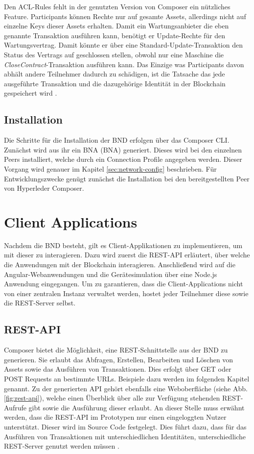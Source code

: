 Den ACL-Rules fehlt in der genutzten Version von Composer ein nützliches Feature. Participants können Rechte nur auf gesamte Assets, allerdings nicht auf einzelne Keys dieser Assets erhalten. Damit ein Wartungsanbieter die eben genannte Transaktion ausführen kann, benötigt er Update-Rechte für den Wartungsvertrag. Damit könnte er über eine Standard-Update-Transaktion den Status des Vertrags auf geschlossen stellen, obwohl nur eine Maschine die \textit{CloseContract}-Transaktion ausführen kann. Das Einzige was Participants davon abhält andere Teilnehmer dadurch zu schädigen, ist die Tatsache das jede ausgeführte Transaktion und die dazugehörige Identität in der Blockchain gespeichert wird \cite{SchererPerformanceScalabilityBlockchain2017}.

\subsection{Installation}
Die Schritte für die Installation der \acs{BND} erfolgen über das Composer CLI. Zunächst wird aus ihr ein \acl{BNA} (\acs{BNA}) generiert. Dieses wird bei den einzelnen Peers installiert, welche durch ein Connection Profile angegeben werden. Dieser Vorgang wird genauer im Kapitel \ref{sec:network-config} beschrieben. Für Entwicklungszwecke genügt zunächst die Installation bei den bereitgestellten Peer von Hyperleder Composer.

\section{Client Applications}
Nachdem die \acs{BND} besteht, gilt es Client-Applikationen zu implementieren, um mit dieser zu interagieren. Dazu wird zuerst die REST-API erläutert, über welche die Anwendungen mit der Blockchain interagieren. Anschließend wird auf die Angular-Webanwendungen und die Gerätesimulation über eine Node.js Anwendung eingegangen. Um zu garantieren, dass die Client-Applications nicht von einer zentralen Instanz verwaltet werden, hostet jeder Teilnehmer diese sowie die REST-Server selbst.

\subsection{REST-API}
\label{subsec:REST}
Composer bietet die Möglichkeit, eine REST-Schnittstelle aus der \acs{BND} zu generieren. Sie erlaubt das Abfragen, Erstellen, Bearbeiten und Löschen von Assets sowie das Ausführen von Transaktionen. Dies erfolgt über GET oder POST Requests an bestimmte URLs. Beispiele dazu werden im folgenden Kapitel genannt. Zu der generierten API gehört ebenfalls eine Weboberfläche (siehe Abb. \ref{fig:rest-api}), welche einen Überblick über alle zur Verfügung stehenden REST-Aufrufe gibt sowie die Ausführung dieser erlaubt. An dieser Stelle muss erwähnt werden, dass die REST-API im Prototypen nur einen eingeloggten Nutzer unterstützt. Dieser wird im Source Code festgelegt. Dies führt dazu, dass für das Ausführen von Transaktionen mit unterschiedlichen Identitäten, unterschiedliche REST-Server genutzt werden müssen \cite{HyperledgerComposerTeamRESTAPIHyperledger}.


